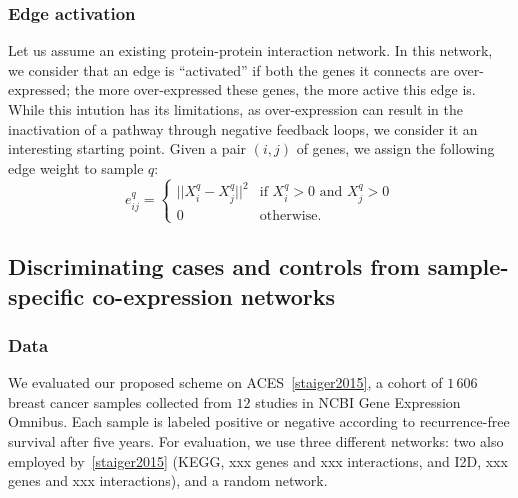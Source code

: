 \documentclass{bioinfo}
\newcommand{\todo}[1]{{\color{teal} #1}}
\begin{document}
\begin{methods}
\subsubsection{Edge activation}
Let us assume an existing protein-protein interaction network. 
In this network, we consider that an edge is ``activated'' if both the genes it connects are over-expressed; the more over-expressed these genes, the more active this edge is. 
While this intution has its limitations, as over-expression can result in the inactivation of a pathway through negative feedback loops, we consider it an interesting starting point.
Given a pair $(i, j)$ of genes, we assign the following edge weight to sample $q$:
\begin{equation}
e_{ij}^q = \begin{cases} ||X_i^q - X_j^q||^2 &\mbox{if } X_i^q > 0 \mbox{ and } X_j^q > 0 \\
0 & \mbox{otherwise.}
\end{cases}
\end{equation}



\subsection{Discriminating cases and controls  from sample-specific co-expression networks}

\subsubsection{Data}
We evaluated our proposed scheme on ACES~\ref{staiger2015}, a cohort of $1\,606$ breast cancer samples collected from $12$ studies in NCBI Gene Expression Omnibus.
Each sample is labeled positive or negative according to recurrence-free survival after five years. 
For evaluation, we use three different networks: two also employed by~\ref{staiger2015} (KEGG, \todo{xxx genes and xxx interactions}, and I2D, \todo{xxx genes and xxx interactions}), and a random network.





\end{methods}
\end{document}
